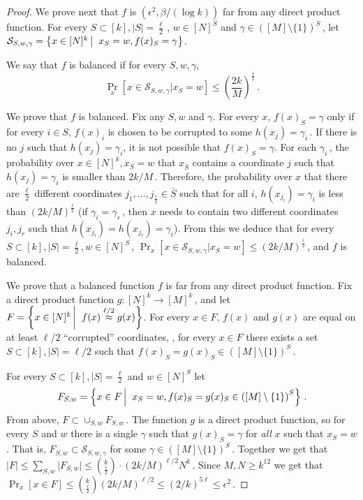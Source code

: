 \documentclass{toc}
\newcommand{\Paren}[1]{\left(#1\right)} %
\newcommand{\abs}[1]{\lvert#1\rvert} %
\newcommand\sett[2]{\left\{ #1 \left| \; \vphantom{#1 #2} \right. #2  \right\}} %
\newcommand{\set}[1]{\{#1\}} %
\newcommand\f{f} %
\newcommand{\g}{g} %
\newcommand\neql[1]{\stackrel{{#1}}{ \approx}} %
\begin{document}
\begin{proof}
    We prove next that $\f$ is 
    $(\epsilon^2,{\beta}/{(\log k)})$ %
     far from any direct product function. For every $S\subset[k],\abs{S}=\frac{\ell}{2}$\,, $w\in[N]^S$ and $\gamma\in \Paren{[M]\setminus\set{1}}^S$\,, let $\mathcal{S}_{S,w,\gamma} = \sett{x\in[N]^k}{x_S=w,\f(x)_S=\gamma}$.
    
    We say that $\f$ is balanced if for every $S,w,\gamma$,
    \[ \Pr_x[x\in \mathcal{S}_{S,w,\gamma} | x_S=w]\leq \Paren{\frac{2k}{M}}^{\frac{\ell}{2}}\,.\]%
    
    We prove that $\f$ is balanced. Fix any $S,w$ and $\gamma$. For every $x$, $\f(x)_S = \gamma$ only if for every $i\in S$, $\f(x)_i$ is chosen to be corrupted to some $h(x_j) = \gamma_i$\,. If there is no $j$ such that $h(x_j)=\gamma_i$, %
it is  %
not possible that $\f(x)_S = \gamma$.
    For each $\gamma_i$\,, the probability over $x\in [N]^k, x_S=w$ that $x_{\bar{S}}$ contains a coordinate $j$ such that $h(x_j) = \gamma_i$ is smaller than 
  $2k/M$\,. %
 Therefore, the probability over $x$ that there are $\frac{\ell}{2}$ different coordinates $j_1,\ldots, j_{\frac{\ell}{2}}\in\bar{S}$ such that for all $i$, $h(x_{j_i}) = \gamma_i$ is less than 
    $\Paren{2k/M}^{\frac{\ell}{2}}$ %
     (if $\gamma_i = \gamma_r$\,, then $x$ needs to contain two different coordinates $j_i,j_r$ such that $h(x_{j_i} )=h(x_{j_r} ) = \gamma_i $). From this we deduce that for every $S\subset[k],\abs{S} = \frac{\ell}{2}, w\in[N]^S$\,,  $\Pr_{x}[x\in \mathcal{S}_{S,w,\gamma}|x_S = w]\leq 
 \Paren{2k/M}^{\frac{\ell}{2}}$\,, %
 and $\f$ is balanced.
    
    We prove that a balanced function $\f$ is far from any direct product function. Fix a direct product function $\g:[N]^k\rightarrow[M]^k$\,, and let $F = \sett{x\in[N]^k}{\f(x)\neql{
   \ell/2 %
}\g(x)}$. For every $x\in F$, $\f(x)$ and $\g(x)$ are equal on at least 
%
$\ell/2$ %
 ``corrupted'' coordinates, \ie, for every $x\in F$ there exists a set $S\subset[k],\abs{S} = 
 \ell/2$ %
  such that $\f(x)_S = \g(x)_S\in \Paren{[M]\setminus \{1\}}^S$\,.
    
    For every $S\subset[k],\abs{S} = \frac{\ell}{2}$ and $w\in[N]^S$ let 
    \[F_{S,w} = \sett{x\in F}{x_S = w, \f(x)_S = \g(x)_S\in \Paren{[M]\setminus \{1\}}^S}\,.\]%
    From above, $F\subset \cup_{S,w}F_{S,w}$\,. The function $\g$ is a direct product function, so for every $S$ and $w$ there is a single $\gamma$ such that $\g(x)_S=\gamma$ for \emph{all} $x$ such that $x_S=w$. That is, $F_{S,w}\subset \mathcal{S}_{S,w,\gamma}$ for some $\gamma\in\Paren{[M]\setminus \{1\}}^S$\,. Together we get that $\abs{F}\leq \sum_{S,w}\abs{F_{S,w}}\leq\binom{k}{\frac{\ell}{2}} \cdot
    \Paren{{2k}/{M}}^{{\ell}/{2}} %
     N^k$\,.
    Since $M,N\geq k^{12}$ we get that $\Pr_x[x\in F]\leq \binom{k}{\frac{\ell}{2}}
    \Paren{{2k}/{M}}^{{\ell}/{2}}\leq \Paren{2/k}^{5 \ell}\leq \epsilon^2$\,.
\end{proof}
\end{document}
